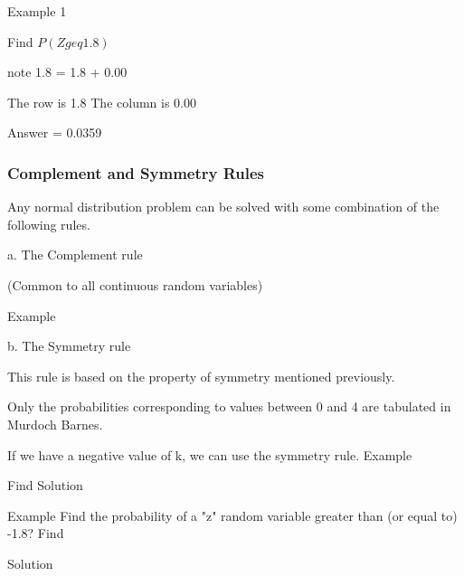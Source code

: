 \begin{frame}
Example 1  

Find  $P(Z geq 1.8)$

note  1.8 = 1.8 + 0.00

    The row is 1.8
    The column is 0.00


\end{frame}
\begin{frame}


Answer   = 0.0359




\end{frame}
\begin{frame}


\frametitle{Complement and Symmetry Rules}

Any normal distribution problem can be solved with some combination of the following rules.
\end{frame}
\begin{frame} 
a. The Complement rule

(Common to all continuous random variables) 

 

Example

   


\end{frame}
\begin{frame}
b. The Symmetry rule
 
This rule is based on the property of symmetry mentioned previously.

 

Only the probabilities corresponding to values between 0 and 4 are tabulated in Murdoch Barnes.

If we have a negative value of k, we can use the symmetry rule.  
Example 

Find  
Solution 

 

Example 
Find the probability of a "z" random variable greater than (or equal to) -1.8?
Find  

Solution

 
\end{frame}
